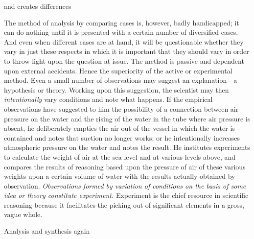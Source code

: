 \documentclass[letterpaper]{book}
\begin{document}
and creates differences

The method of analysis by comparing cases is, however, badly
handicapped; it can do nothing until it is presented with a certain
number of diversified cases. And even when different cases are at hand,
it will be questionable whether they vary in just these respects in
which it is important that they should vary in order to throw light upon
the question at issue. The method is passive and dependent upon external
accidents. Hence the superiority of the active or experimental method.
Even a small number of observations may suggest an explanation---a
hypothesis or theory. Working upon this suggestion, the scientist may
then \emph{intentionally} vary conditions and note what happens. If the
empirical observations have suggested to him the possibility of a
connection between air pressure on the water and the rising of the water
in the tube where air pressure is absent, he deliberately empties the
air out of the vessel in which the water is contained and notes that
suction no longer works; or he intentionally increases atmospheric
pressure on the water and notes the result. He institutes experiments to
calculate the weight of air at the sea level and at various levels
above, and compares the results of reasoning based upon the pressure of
air
of these various weights upon a certain volume of water with the results
actually obtained by observation. \emph{Observations formed by variation
of conditions on the basis of some idea or theory constitute
experiment.} Experiment is the chief resource in scientific reasoning
because it facilitates the picking out of significant elements in a
gross, vague whole.

Analysis and synthesis again
\end{document}
